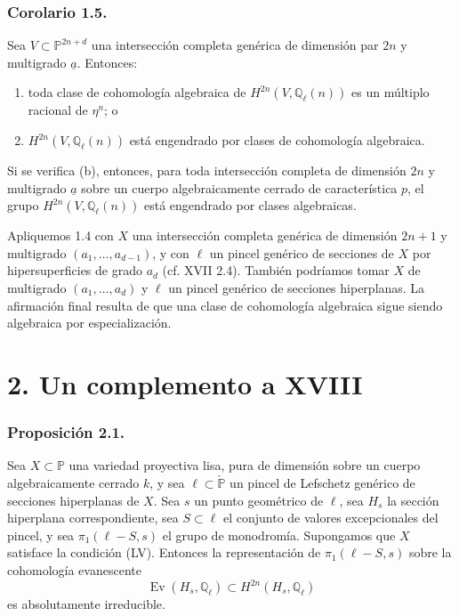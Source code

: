 \pageoriginale

\subsubsection*{Corolario 1.5.}

Sea $V\subset\mathbb P^{2n+d}$ una intersección completa genérica de
dimensión par $2n$ y multigrado $\underline a$. Entonces:
\begin{enumerate}[label=(\alph*)]
\item toda clase de cohomología algebraica de
  $H^{2n}(V,\mathbb Q_\ell(n))$ es un múltiplo racional de $\eta^n$; o
\item $H^{2n}(V,\mathbb Q_\ell(n))$ está engendrado por clases de
  cohomología algebraica.
\end{enumerate}
Si se verifica (b), entonces, para toda intersección completa de
dimensión $2n$ y multigrado $\underline a$ sobre un cuerpo
algebraicamente cerrado de característica $p$, el grupo
$H^{2n}(V,\mathbb Q_\ell(n))$ está engendrado por clases algebraicas.

Apliquemos 1.4 con $X$ una intersección completa genérica de dimensión
$2n+1$ y multigrado $(a_1,\ldots,a_{d-1})$, y con $\ell$ un pincel
genérico de secciones de $X$ por hipersuperficies de grado $a_d$
(cf. XVII 2.4). También podríamos tomar $X$ de multigrado
$(a_1,\ldots,a_d)$ y $\ell$ un pincel genérico de secciones
hiperplanas. La afirmación final resulta de que una clase de cohomología
algebraica sigue siendo algebraica por especialización.

\section*{2. Un complemento a XVIII}

\subsubsection*{Proposición 2.1.}

Sea $X\subset\mathbb P$ una variedad proyectiva lisa, pura de dimensión
 sobre un cuerpo algebraicamente cerrado
$k$, y sea $\ell\subset\check{\mathbb P}$ un pincel de Lefschetz
genérico de secciones hiperplanas de $X$. Sea $s$ un punto geométrico
de $\ell$, sea $H_s$ la sección hiperplana correspondiente, sea
$S\subset\ell$ el conjunto de valores excepcionales del pincel, y sea
$\pi_1(\ell-S,s)$ el grupo de monodromía. Supongamos que $X$ satisface
la condición (LV). Entonces la representación de $\pi_1(\ell-S,s)$
sobre la cohomología evanescente
\[
\operatorname{Ev}(H_s,\mathbb Q_\ell)
\subset H^{2n}(H_s,\mathbb Q_\ell)
\]
es absolutamente irreducible.

